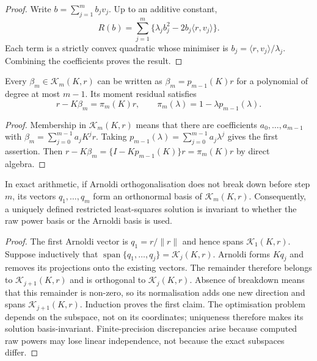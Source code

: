 \begin{proof}
Write $b=\sum_{j=1}^m b_jv_j$.  Up to an additive constant,
\[
 R(b)=\sum_{j=1}^m
 \{\lambda_jb_j^2-2b_j\langle r,v_j\rangle\}.
\]
Each term is a strictly convex quadratic whose minimiser is
$b_j=\langle r,v_j\rangle/\lambda_j$.  Combining the coefficients proves
the result.
\end{proof}

\begin{proposition}
\label{prop:app-krylov-polynomial}
Every $\beta_m\in\mathcal K_m(K,r)$ can be written as
$\beta_m=p_{m-1}(K)r$ for a polynomial of degree at most $m-1$.  Its moment
residual satisfies
\[
 r-K\beta_m=\pi_m(K)r,
 \qquad \pi_m(\lambda)=1-\lambda p_{m-1}(\lambda).
\]
\end{proposition}

\begin{proof}
Membership in $\mathcal K_m(K,r)$ means that there are coefficients
$a_0,\ldots,a_{m-1}$ with
$\beta_m=\sum_{j=0}^{m-1}a_jK^jr$.  Taking
$p_{m-1}(\lambda)=\sum_{j=0}^{m-1}a_j\lambda^j$ gives the first assertion.
Then
$r-K\beta_m=\{I-Kp_{m-1}(K)\}r=\pi_m(K)r$ by direct algebra.
\end{proof}

\begin{proposition}
\label{prop:app-arnoldi-span}
In exact arithmetic, if Arnoldi orthogonalisation does not break down before
step $m$, its vectors $q_1,\ldots,q_m$ form an orthonormal basis of
$\mathcal K_m(K,r)$.  Consequently, a uniquely defined restricted
least-squares solution is invariant to whether the raw power basis or the
Arnoldi basis is used.
\end{proposition}

\begin{proof}
The first Arnoldi vector is $q_1=r/\|r\|$ and hence spans
$\mathcal K_1(K,r)$.  Suppose inductively that
$\operatorname{span}\{q_1,\ldots,q_j\}=\mathcal K_j(K,r)$.  Arnoldi forms
$Kq_j$ and removes its projections onto the existing vectors.  The remainder
therefore belongs to $\mathcal K_{j+1}(K,r)$ and is orthogonal to
$\mathcal K_j(K,r)$.  Absence of breakdown means that this remainder is
non-zero, so its normalisation adds one new direction and spans
$\mathcal K_{j+1}(K,r)$.  Induction proves the first claim.  The optimisation
problem depends on the subspace, not on its coordinates; uniqueness therefore
makes its solution basis-invariant.  Finite-precision discrepancies arise
because computed raw powers may lose linear independence, not because the
exact subspaces differ.
\end{proof}

